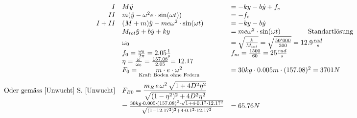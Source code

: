 \[
	\begin{array}{rll}
		I&M\ddot{y} &= -k y -b\dot{y} +f_e\\
		II&m(\ddot{y}-\omega^2 e\cdot\sin(\omega t))&=-f_e\\
		I+II&(M+m)\ddot{y} - me\omega^2 \cdot \sin(\omega t) &=-ky-b\dot{y}\\
		& M_{tot} \ddot{y} +b\dot{y} + ky &= m e\omega^2 \cdot \sin(\omega t)\qquad \qquad \textrm{Standartlösung}\\
		&\omega_0 &=\sqrt{\frac{k}{M_{tot}}} = \sqrt{\frac{50'000}{300}} = 12.9\frac{rad}{s}\\
		&f_0 = \frac{\omega_0}{2\pi} = 2.05\frac{1}{s}&f_m = \frac{1500}{60} = 25\frac{rad}{s}	\\
		&\eta = \frac{\omega}{\omega_0} = \frac{157.08}{2.05} = 12.17\\
		&F_0=\underset{\textrm{Kraft Boden ohne Federn}}{m\cdot e\cdot \omega^2}  &= 30kg\cdot 0.005m\cdot (157.08)^2 = 3701N\\[1em]
		\textrm{Oder gemäss \ref{Unwucht} S. \pageref{Unwucht}}& F_{B0}=\dfrac{m_R\,e\,\omega^2\,\sqrt{1+4D^2\eta^2}}{\sqrt{(1-\eta^2)^2+4D^2\eta^2}}\\
		&=\frac{30kg\cdot 0.005\cdot (157.08)^2\cdot \sqrt{1+4\cdot 0.1^2\cdot 12.17^2}}{\sqrt{(1-12.17^2)^2+4\cdot 0.1^2\cdot 12.17^2}} &= 65.76N
	\end{array}
\]


